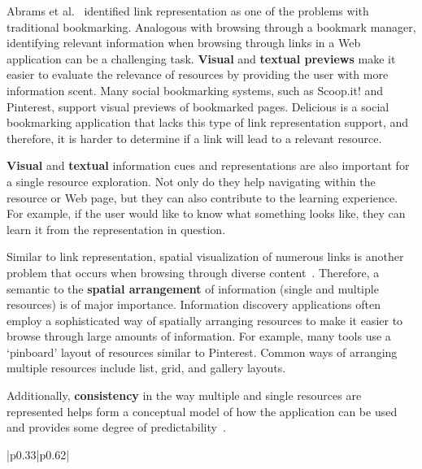 {{Abrams et al.~\cite{abrams1998information} identified link representation as one of the problems with traditional bookmarking. Analogous with browsing through a bookmark manager, identifying relevant information when browsing through links in a Web application can be a challenging task. \textbf{Visual} and \textbf{textual previews} make it easier to evaluate the relevance of resources by providing the user with more information scent. Many social bookmarking systems, such as Scoop.it! and Pinterest, support visual previews of bookmarked pages. Delicious is a social bookmarking application that lacks this type of link representation support, and therefore, it is harder to determine if a link will lead to a relevant resource.

\textbf{Visual} and \textbf{textual} information cues and representations are also important for a single resource exploration. Not only do they help navigating within the resource or Web page, but they can also contribute to the learning experience. For example, if the user would like to know what something looks like, they can learn it from the representation in question.  

Similar to link representation, spatial visualization of numerous links is another problem that occurs when browsing through diverse content~\cite{abrams1998information}. Therefore, a semantic to the \textbf{spatial arrangement} of information (single and multiple resources) is of major importance. Information discovery applications often employ a sophisticated way of spatially arranging resources to make it easier to browse through large amounts of information. For example, many tools use a `pinboard' layout of resources similar to Pinterest. Common ways of arranging multiple resources include list, grid, and gallery layouts. 

Additionally, \textbf{consistency} in the way multiple and single resources are represented helps form a conceptual model of how the application can be used and provides some degree of predictability~\cite{norman2002design}.

\begin{table}[ht!]
\caption{Visual and Spatial Exploration Mechanisms}
\label{table:exploration} 
\begin{tabular}{{|p{0.33\linewidth}|p{0.62\linewidth}|}}


\end{tabular}
\end{table}}}
